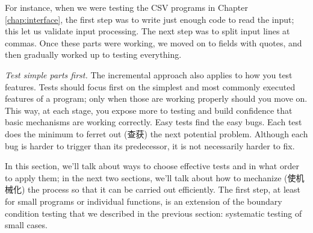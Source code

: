 For instance, when we were testing the CSV programs in Chapter
\ref{chap:interface}, the first step was to write just enough code to read
the input; this let us validate input processing.  The next step was to
split input lines at commas. Once these parts were working, we moved on to
fields with quotes, and then gradually worked up to testing everything.

\emph{Test simple parts first.} The incremental approach also applies to
how you test features. Tests should focus first on the simplest and most
commonly executed features of a program; only when those are working
properly should you move on. This way, at each stage, you expose more to
testing and build confidence that basic mechanisms are working correctly.
Easy tests find the easy bugs. Each test does the minimum to ferret out
(查获) the next potential problem. Although each bug is harder to trigger
than its predecessor, it is not necessarily harder to fix.

In this section, we'll talk about ways to choose effective tests and in
what order to apply them; in the next two sections, we'll talk about how to
mechanize (使机械化) the process so that it can be carried out efficiently.
The first step, at least for small programs or individual functions, is an
extension of the boundary condition testing that we described in the
previous section: systematic testing of small cases.

